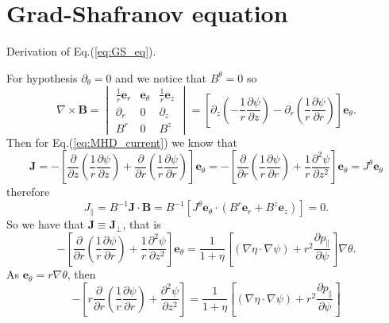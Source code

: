 \section{Grad-Shafranov equation}
Derivation of Eq.(\ref{eq:GS_eq}).
\medskip

For hypothesis $\partial_\theta=0$ and we notice that $B^\theta=0$ so
\begin{equation*}
  \nabla\times\mathbf{B}=\displaystyle
    \begin{vmatrix}
      \displaystyle\frac{1}{r}\mathbf{e}_r & \mathbf{e}_\theta & \displaystyle\frac{1}{r}\mathbf{e}_z\\
      \partial_r & 0 & \partial_z\\
    B^r & 0 & B^z
  \end{vmatrix}
  =\left[\partial_z\left(-\frac{1}{r}\frac{\partial\psi}{\partial z}\right)-\partial_r\left(\frac{1}{r}\frac{\partial\psi}{\partial r}\right)\right]\mathbf{e}_\theta.
\end{equation*}
Then for Eq.(\ref{eq:MHD_current}) we know that
\begin{equation*}
  \mathbf{J}=-\left[\frac{\partial}{\partial z}\left(\frac{1}{r}\frac{\partial\psi}{\partial z}\right)+\frac{\partial}{\partial r}\left(\frac{1}{r}\frac{\partial\psi}{\partial r}\right)\right]\mathbf{e}_\theta
  =-\left[\frac{\partial}{\partial r}\left(\frac{1}{r}\frac{\partial\psi}{\partial r}\right)+\frac{1}{r}\frac{\partial^2\psi}{\partial z^2}\right]\mathbf{e}_\theta=J^\theta\mathbf{e}_\theta
\end{equation*}
therefore
\begin{equation*}
  J_\parallel=B^{-1}\mathbf{J}\cdot\mathbf{B}=B^{-1}[J^\theta\mathbf{e}_\theta\cdot(B^r\mathbf{e}_r+B^z\mathbf{e}_z)]=0.
\end{equation*}
So we have that $\mathbf{J}\equiv\mathbf{J}_\perp$, that is
\begin{equation*}
  -\left[\frac{\partial}{\partial r}\left(\frac{1}{r}\frac{\partial\psi}{\partial r}\right)+\frac{1}{r}\frac{\partial^2\psi}{\partial z^2}\right]\mathbf{e}_\theta
  =\frac{1}{1+\eta}\left[(\nabla\eta\cdot\nabla\psi)+r^2\frac{\partial p_\parallel}{\partial \psi}\right]\nabla\theta.
\end{equation*}
As $\mathbf{e}_\theta=r\nabla\theta$, then
\begin{equation*}
 -\left[r\frac{\partial}{\partial r}\left(\frac{1}{r}\frac{\partial\psi}{\partial r}\right)+\frac{\partial^2\psi}{\partial z^2}\right]
=\frac{1}{1+\eta}\left[(\nabla\eta\cdot\nabla\psi)+r^2\frac{\partial p_\parallel}{\partial \psi}\right]
\end{equation*}
